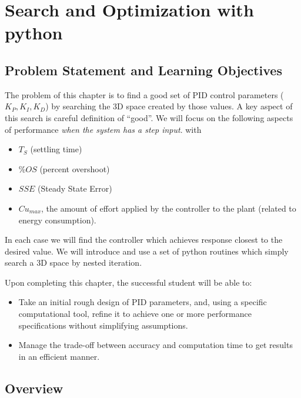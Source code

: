 %
%
%

\chapter{Search and Optimization with python}

\section{Problem Statement and Learning Objectives}

The problem of this chapter is to find a good set of PID control parameters ($K_P,K_I,K_D$) by searching the 3D space created by those values.
A key aspect of this search is careful definition of ``good''.  We will focus on  the following aspects of performance
{\it when the system has a step input}.
with
\begin{itemize}
\item  $T_S$ (settling time)
\item $\%OS$ (percent overshoot)
\item $SSE$ (Steady State Error)
\item $Cu_{max}$, the amount of effort applied by the controller to the plant (related to energy consumption).
\end{itemize}

In each case we will find the controller which achieves response closest to the desired value.
We will introduce and use a set of python routines which simply search a 3D space by nested iteration.

Upon completing this chapter, the successful student will be able to:

\begin{itemize}
  \item Take an initial rough design of PID parameters, and, using a specific computational tool, refine it to achieve one or more performance specifications without simplifying assumptions.
  \item Manage the trade-off between accuracy and computation time to get results in an efficient manner.
\end{itemize}





\section{Overview}

